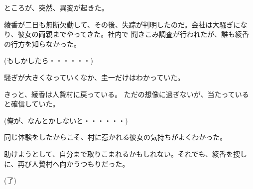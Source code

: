﻿\documentclass[book,tate]{jlreq}
\begin{document}
ところが、突然、異変が起きた。

綾香が二日も無断欠勤して、その後、失踪が判明したのだ。会社は大騒ぎになり、彼女の両親までやってきた。社内で 聞きこみ調査が行われたが、誰も綾香の行方を知らなかった。

(もしかしたら・・・・・・)

騒ぎが大きくなっていくなか、圭一だけはわかっていた。

きっと、綾香は人贄村に戻っている。 ただの想像に過ぎないが、当たっていると確信していた。

(俺が、なんとかしないと・・・・・・)

同じ体験をしたからこそ、村に惹かれる彼女の気持ちがよくわかった。

助けようとして、自分まで取りこまれるかもしれない。それでも、綾香を捜しに、再び人贄村へ向かうつもりだった。

(了)
\end{document}
